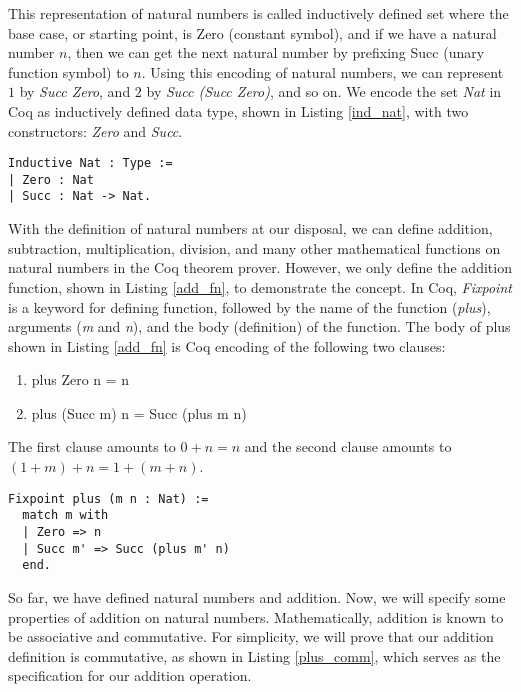 \documentclass[conference,compsoc]{IEEEtran}
\begin{document}
\noindent 
This representation of natural numbers is called 
inductively defined set where the base case, or starting point,
is Zero (constant symbol), and if we have a natural number $n$, then we can 
get the next natural number by prefixing Succ (unary function symbol) to $n$.  
Using this encoding of natural numbers, we can represent 
$1$ by \emph{Succ Zero}, and $2$ by \emph{Succ (Succ Zero)}, 
and so on. We encode the set \emph{Nat} in Coq as inductively defined data type, 
shown in Listing \ref{ind_nat}, with 
two constructors: \emph{Zero} and \emph{Succ}. 
\begin{lstlisting}[frame=single, language=Coq, caption={Definition of Natural Number},
  label={ind_nat},captionpos=t, basicstyle=\ttfamily\footnotesize,
  abovecaptionskip=-\medskipamount]
Inductive Nat : Type := 
| Zero : Nat 
| Succ : Nat -> Nat.
\end{lstlisting}


With the definition of natural numbers at our disposal,
we can define addition, subtraction, multiplication, division, and 
many other mathematical functions on natural numbers in the Coq theorem prover. 
However, we only define the addition function,
shown in Listing \ref{add_fn}, to demonstrate the concept. 
In Coq, \emph{Fixpoint} is a keyword 
for defining function, followed by the name of the function (\emph{plus}), 
arguments (\emph{m} and \emph{n}), and the body (definition) of the function.
The body of plus shown in Listing \ref{add_fn} is Coq encoding of the 
following two clauses: 
\begin{enumerate}
  \item plus Zero n = n 
  \item plus (Succ m) n = Succ (plus m n)
\end{enumerate}  

\noindent 
The first clause amounts to $0 + n = n$ and the second clause
amounts to $ (1 + m) + n = 1 + (m + n)$.


\begin{lstlisting}[frame=single, language=Coq, caption={Addition of two Natural Numbers},
  label={add_fn},captionpos=t, basicstyle=\ttfamily\footnotesize,
  abovecaptionskip=-\medskipamount]
Fixpoint plus (m n : Nat) :=
  match m with
  | Zero => n
  | Succ m' => Succ (plus m' n)
  end.

\end{lstlisting}

So far, we have defined natural numbers and addition. Now, we will specify 
some properties of addition on natural numbers. Mathematically, addition 
is known to be associative and commutative. For simplicity, we will 
prove that our addition definition is commutative, as shown in 
Listing \ref{plus_comm}, which serves as the specification for our 
addition operation.
\end{document}
